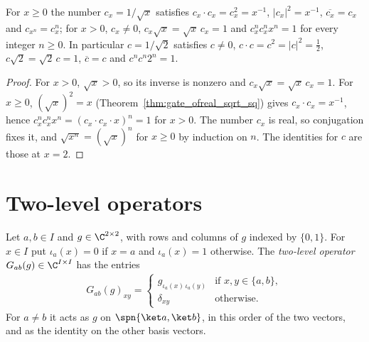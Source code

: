 \begin{theorem}
    \label{thm:gate_inv_sqrt_two}
    \leanok
    For $x\geq0$ the number $c_x=1/\sqrt x$ satisfies $c_x\cdot c_x=c_x^2=x^{-1}$,
    $|c_x|^2=x^{-1}$, $\overline{c_x}=c_x$ and $c_{x^n}=c_x^n$; for $x>0$, $c_x\neq0$,
    $c_x\sqrt x=\sqrt x\,c_x=1$ and $c_x^nc_x^nx^n=1$ for every integer $n\geq0$. In
    particular $c=1/\sqrt2$ satisfies $c\neq0$, $c\cdot c=c^2=|c|^2=\tfrac12$,
    $c\sqrt2=\sqrt2\,c=1$, $\overline c=c$ and $c^nc^n2^n=1$.
\end{theorem}
\begin{proof}\leanok
    For $x>0$, $\sqrt x>0$, so its inverse is nonzero and $c_x\sqrt x=\sqrt x\,c_x=1$.
    For $x\geq0$, $(\sqrt x)^2=x$ (Theorem~\ref{thm:gate_ofreal_sqrt_sq}) gives
    $c_x\cdot c_x=x^{-1}$, hence $c_x^nc_x^nx^n=(c_x\cdot c_x\cdot x)^n=1$ for $x>0$. The
    number $c_x$ is real, so conjugation fixes it, and $\sqrt{x^n}=(\sqrt x)^n$ for $x\geq0$
    by induction on $n$. The identities for $c$ are those at $x=2$.
\end{proof}

\section{Two-level operators}
\label{sec:gate_two_level}

\begin{definition}
    \label{def:gate_two_level}
    \leanok
    Let $a,b\in I$ and $g\in\C^{2\times2}$, with rows and columns of $g$
    indexed by $\{0,1\}$. For $x\in I$ put $\iota_a(x)=0$ if $x=a$ and
    $\iota_a(x)=1$ otherwise. The \emph{two-level operator}
    $G_{ab}(g)\in\C^{I\times I}$ has the entries
    \begin{align}
        G_{ab}(g)_{xy}=
        \begin{cases}
            g_{\iota_a(x)\,\iota_a(y)} & \text{if } x,y\in\{a,b\}, \\
            \delta_{xy}                & \text{otherwise.}
        \end{cases}
        \label{eq:gate_two_level}
    \end{align}
    For $a\neq b$ it acts as $g$ on $\spn\{\ket a,\ket b\}$, in
    this order of the two vectors, and as the identity on the other basis
    vectors.
\end{definition}

